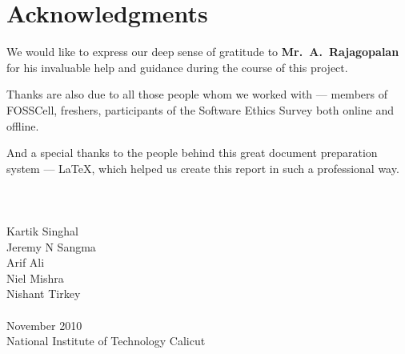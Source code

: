 \clearpage
{}
\chapter*{Acknowledgments}
\vspace{1.0in}
We would like to express our deep sense of gratitude to {\bf Mr.\ A.\ Rajagopalan} for his invaluable help and guidance during the course of this project.

Thanks are also due to all those people whom we worked with --- members of FOSSCell, freshers, participants of the Software Ethics Survey both online and offline.

And a special thanks to the people behind this great document preparation system --- \LaTeX, which helped us create this report in such a professional way.
\\
\\
\\ 
\\
Kartik Singhal \\
Jeremy N Sangma \\ 
Arif Ali \\ 
Niel Mishra \\ 
Nishant Tirkey \\ 
\\
November 2010\\
{National Institute of Technology Calicut}\\
\newpage
